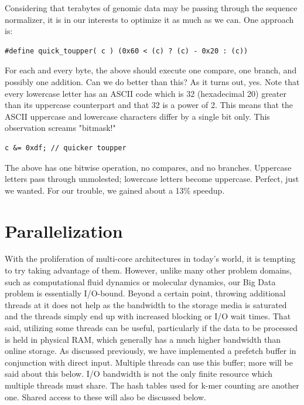 \documentclass{article}
\begin{document}
Considering that terabytes of genomic data may be passing through the sequence normalizer, it is in our interests to optimize it as much as we can. One approach is:

\begin{verbatim}
#define quick_toupper( c ) (0x60 < (c) ? (c) - 0x20 : (c))
\end{verbatim}

For each and every byte, the above should execute one compare, one branch, and possibly one addition. Can we do better than this? As it turns out, yes. Note that every lowercase letter has an ASCII code which is 32 (hexadecimal 20) greater than its uppercase counterpart and that 32 is a power of 2. This means that the ASCII uppercase and lowercase characters differ by a single bit only. This observation screams "bitmask!"

\begin{verbatim}
c &= 0xdf; // quicker toupper
\end{verbatim}

The above has one bitwise operation, no compares, and no branches. Uppercase letters pass through unmolested; lowercase letters become uppercase. Perfect, just we wanted. For our trouble, we gained about a 13\% speedup.

\section{Parallelization}

With the proliferation of multi-core architectures in today's world, it is tempting to try taking advantage of them. However, unlike many other problem domains, such as computational fluid dynamics or molecular dynamics, our Big Data problem is essentially I/O-bound. Beyond a certain point, throwing additional threads at it does not help as the bandwidth to the storage media is saturated and the threads simply end up with increased blocking or I/O wait times. That said, utilizing some threads can be useful, particularly if the data to be processed is held in physical RAM, which generally has a much higher bandwidth than online storage. As discussed previously, we have implemented a prefetch buffer in conjunction with direct input. Multiple threads can use this buffer; more will be said about this below. I/O bandwidth is not the only finite resource which multiple threads must share. The hash tables used for k-mer counting are another one. Shared access to these will also be discussed below.
\end{document}
